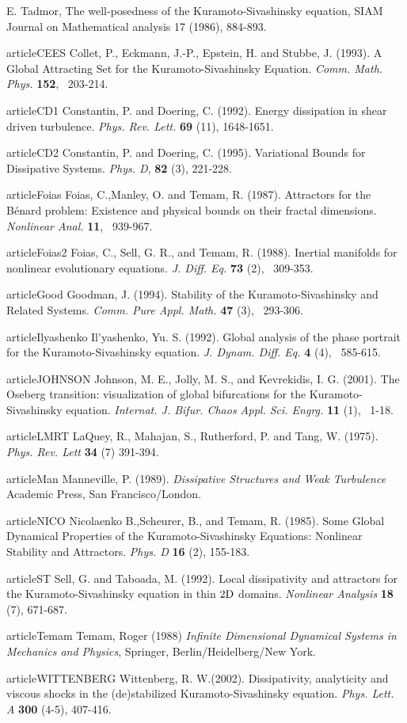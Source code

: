 E. Tadmor, The well-posedness of the Kuramoto-Sivashinsky equation, SIAM Journal on Mathematical analysis 17 (1986), 884-893.

   
article{CEES}
Collet, P., Eckmann, J.-P., Epstein, H. and Stubbe, J. (1993).
A Global Attracting Set for the Kuramoto-Sivashinsky Equation.
{\it Comm. Math. Phys.}
{\bf 152}, ~203-214.

article{CD1} Constantin, P. and Doering, C. (1992).
Energy dissipation in shear driven turbulence.  
{\it Phys. Rev. Lett.} {\bf 69} (11), 1648-1651.  

article{CD2} Constantin, P. and Doering, C. (1995).
Variational Bounds for Dissipative Systems.
{\it Phys. D}, {\bf 82} (3), 221-228.

article{Foias} 
Foias, C.,Manley, O. and Temam, R. (1987).
Attractors for the B\'{e}nard problem: 
Existence and physical bounds on their fractal dimensions.
{\it Nonlinear Anal.}
{\bf 11}, ~939-967.

article{Foias2}
Foias, C., Sell, G. R., and  Temam, R. (1988).
Inertial manifolds for nonlinear evolutionary equations.
{\it J. Diff. Eq.}
{\bf 73} (2), ~309-353.

article{Good}
Goodman, J. (1994).
Stability of the Kuramoto-Sivashinsky and Related Systems.
{\it Comm. Pure Appl. Math.}
{\bf 47} (3), ~293-306.

article{Ilyashenko} 
Il\'{}yashenko, Yu. S. (1992).
Global analysis of the phase portrait for the Kuramoto-Sivashinsky equation.
{\it J. Dynam. Diff. Eq.}
{\bf 4}  (4), ~585-615.

article{JOHNSON}
 Johnson, M. E., Jolly, M. S., and  Kevrekidis, I. G. (2001).
The Oseberg transition: visualization of global bifurcations for the
Kuramoto-Sivashinsky equation.
{\it Internat. J. Bifur. Chaos Appl. Sci. Engrg.}
{\bf 11} (1), ~1-18. 

article{LMRT} LaQuey, R., Mahajan, S., Rutherford, P. and Tang, W. (1975).
{\it Phys. Rev. Lett} {\bf 34} (7) 391-394.


article{Man} Manneville, P. (1989). 
{\it Dissipative Structures and Weak Turbulence} Academic Press, San Francisco/London.  

article{NICO}
Nicolaenko B.,Scheurer, B., and Temam, R. (1985).
Some Global Dynamical Properties of the Kuramoto-Sivashinsky Equations: Nonlinear Stability and Attractors.
{\it Phys. D}
{\bf 16} (2), 155-183.

article{ST} Sell, G. and Taboada, M. (1992).
 Local dissipativity and attractors for the Kuramoto-Sivashinsky 
equation in thin $2{\rm D}$ domains.
{\it Nonlinear Analysis} {\bf 18} (7), 671-687.

article{Temam}
Temam, Roger (1988) 
{\itshape Infinite Dimensional Dynamical Systems in Mechanics and Physics},
Springer, Berlin/Heidelberg/New York.

article{WITTENBERG}
Wittenberg, R. W.(2002). 
Dissipativity, analyticity and viscous shocks in the (de)stabilized
Kuramoto-Sivashinsky equation.
{\it Phys. Lett. A}
{\bf 300} (4-5), 407-416.
